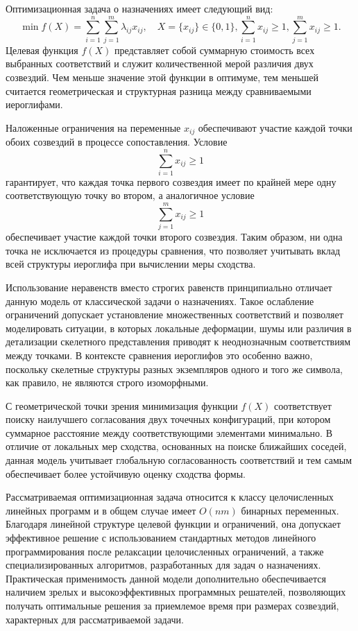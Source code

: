 Оптимизационная задача о назначениях имеет следующий вид:
\[
    \min f(X) = \sum_{i=1}^{n}\sum_{j=1}^{m}\lambda_{ij}x_{ij}, \quad X =\{x_{ij}\} \in \{0,1\}, \sum_{i=1}^{n}x_{ij}\ge 1, \sum_{j=1}^{m}x_{ij}\ge 1.
\]
Целевая функция $f(X)$ представляет собой суммарную стоимость всех выбранных соответствий и служит количественной мерой различия двух созвездий. Чем меньше значение этой функции в оптимуме, тем меньшей считается геометрическая и структурная разница между сравниваемыми иероглифами.

Наложенные ограничения на переменные $x_{ij}$ обеспечивают участие каждой точки обоих созвездий в процессе сопоставления. Условие
\[
    \sum_{i=1}^{n}x_{ij}\ge 1
\]
гарантирует, что каждая точка первого созвездия имеет по крайней мере одну соответствующую точку во втором, а аналогичное условие
\[
    \sum_{j=1}^{m}x_{ij}\ge 1
\]
обеспечивает участие каждой точки второго созвездия. Таким образом, ни одна точка не исключается из процедуры сравнения, что позволяет учитывать вклад всей структуры иероглифа при вычислении меры сходства.

Использование неравенств вместо строгих равенств принципиально отличает данную модель от классической задачи о назначениях. Такое ослабление ограничений допускает установление множественных соответствий и позволяет моделировать ситуации, в которых локальные деформации, шумы или различия в детализации скелетного представления приводят к неоднозначным соответствиям между точками. В контексте сравнения иероглифов это особенно важно, поскольку скелетные структуры разных экземпляров одного и того же символа, как правило, не являются строго изоморфными.

С геометрической точки зрения минимизация функции $f(X)$ соответствует поиску наилучшего согласования двух точечных конфигураций, при котором суммарное расстояние между соответствующими элементами минимально. В отличие от локальных мер сходства, основанных на поиске ближайших соседей, данная модель учитывает глобальную согласованность соответствий и тем самым обеспечивает более устойчивую оценку сходства формы.

Рассматриваемая оптимизационная задача относится к классу целочисленных линейных программ и в общем случае имеет $O(nm)$ бинарных переменных. Благодаря линейной структуре целевой функции и ограничений, она допускает эффективное решение с использованием стандартных методов линейного программирования после релаксации целочисленных ограничений, а также специализированных алгоритмов, разработанных для задач о назначениях. Практическая применимость данной модели дополнительно обеспечивается наличием зрелых и высокоэффективных программных решателей, позволяющих получать оптимальные решения за приемлемое время при размерах созвездий, характерных для рассматриваемой задачи.

